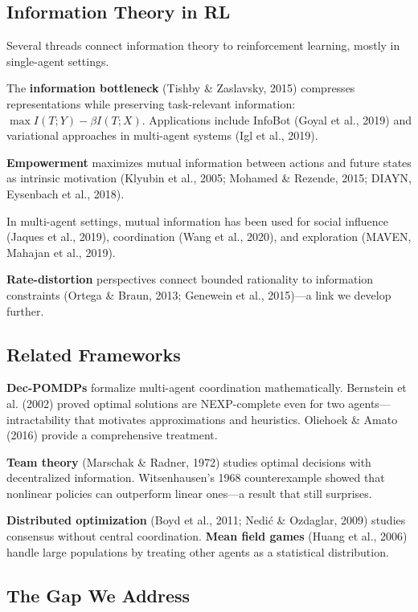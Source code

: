 \documentclass[10pt, letterpaper]{article}
\begin{document}
\subsection{Information Theory in RL}

Several threads connect information theory to reinforcement learning, mostly in single-agent settings.

The \textbf{information bottleneck} (Tishby \& Zaslavsky, 2015) compresses representations while preserving task-relevant information: $\max I(T;Y) - \beta I(T;X)$. Applications include InfoBot (Goyal et al., 2019) and variational approaches in multi-agent systems (Igl et al., 2019).

\textbf{Empowerment} maximizes mutual information between actions and future states as intrinsic motivation (Klyubin et al., 2005; Mohamed \& Rezende, 2015; DIAYN, Eysenbach et al., 2018).

In multi-agent settings, mutual information has been used for social influence (Jaques et al., 2019), coordination (Wang et al., 2020), and exploration (MAVEN, Mahajan et al., 2019).

\textbf{Rate-distortion} perspectives connect bounded rationality to information constraints (Ortega \& Braun, 2013; Genewein et al., 2015)---a link we develop further.

\subsection{Related Frameworks}

\textbf{Dec-POMDPs} formalize multi-agent coordination mathematically. Bernstein et al. (2002) proved optimal solutions are NEXP-complete even for two agents---intractability that motivates approximations and heuristics. Oliehoek \& Amato (2016) provide a comprehensive treatment.

\textbf{Team theory} (Marschak \& Radner, 1972) studies optimal decisions with decentralized information. Witsenhausen's 1968 counterexample showed that nonlinear policies can outperform linear ones---a result that still surprises.

\textbf{Distributed optimization} (Boyd et al., 2011; Nedi\'c \& Ozdaglar, 2009) studies consensus without central coordination. \textbf{Mean field games} (Huang et al., 2006) handle large populations by treating other agents as a statistical distribution.

\subsection{The Gap We Address}
\end{document}
